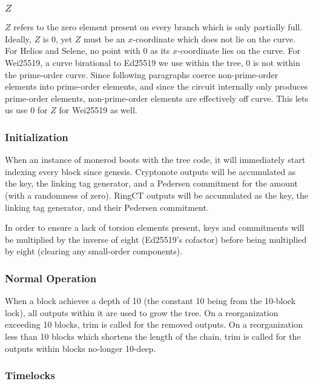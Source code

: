 \documentclass[]{article}
\begin{document}
\subsubsection{$Z$}

$Z$ refers to the zero element present on every branch which is only partially full. Ideally, $Z$ is $0$, yet $Z$ must be an $x$-coordinate which does not lie on the curve. For Helios and Selene, no point with $0$ as its $x$-coordinate lies on the curve. For Wei25519, a curve birational to Ed25519 we use within the tree, $0$ is not within the prime-order curve. Since following paragraphs coerce non-prime-order elements into prime-order elements, and since the circuit internally only produces prime-order elements, non-prime-order elements are effectively off curve. This lets us use $0$ for $Z$ for Wei25519 as well.

\subsubsection{Initialization}

When an instance of monerod boots with the tree code, it will immediately start indexing every block since genesis. Cryptonote outputs will be accumulated as the key, the linking tag generator, and a Pedersen commitment for the amount (with a randomness of zero). RingCT outputs will be accumulated as the key, the linking tag generator, and their Pedersen commitment.

In order to ensure a lack of torsion elements present, keys and commitments will be multiplied by the inverse of eight (Ed25519's cofactor) before being multiplied by eight (clearing any small-order components).

\subsubsection{Normal Operation}

When a block achieves a depth of 10 (the constant 10 being from the 10-block lock), all outputs within it are used to grow the tree. On a reorganization exceeding 10 blocks, trim is called for the removed outputs. On a reorganization less than 10 blocks which shortens the length of the chain, trim is called for the outputs within blocks no-longer 10-deep.

\subsubsection{Timelocks}
\end{document}
